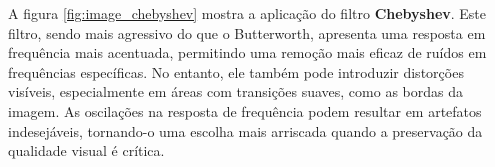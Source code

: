 A figura \ref{fig:image_chebyshev} mostra a aplicação do filtro \textbf{Chebyshev}. Este filtro, sendo mais agressivo do que o Butterworth, apresenta uma resposta em frequência mais acentuada, permitindo uma remoção mais eficaz de ruídos em frequências específicas. No entanto, ele também pode introduzir distorções visíveis, especialmente em áreas com transições suaves, como as bordas da imagem. As oscilações na resposta de frequência podem resultar em artefatos indesejáveis, tornando-o uma escolha mais arriscada quando a preservação da qualidade visual é crítica.
